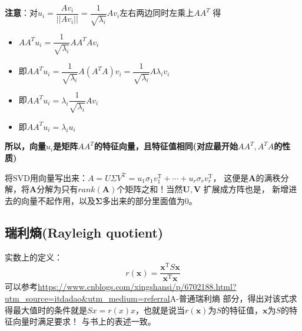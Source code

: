 \textbf{注意}：对$u_{i}=\dfrac{A v_{i}}{\left||A v_{i}\right||}=\dfrac{1}{\sqrt{\lambda_{i}}} A v_{i}$左右两边同时左乘上$AA^T$
    得
\begin{itemize}
    \item $AA^Tu_{i}=\dfrac{1}{\sqrt{\lambda_{i}}} AA^TA v_{i}$
    \item 即$AA^Tu_{i}=\dfrac{1}{\sqrt{\lambda_{i}}} A(A^TA) v_{i}=\dfrac{1}{\sqrt{\lambda_{i}}} A \lambda_i v_{i}$
    \item 即$AA^Tu_{i}=\lambda_i \dfrac{1}{\sqrt{\lambda_{i}}} A  v_{i}$
    \item 即$AA^Tu_{i}=\lambda_i u_i$
\end{itemize}
\textbf{所以，向量$u_i$是矩阵$AA^T$的特征向量，且特征值相同(对应最开始$AA^T, A^TA$的性质)}

将SVD用向量写出来：$A=U \Sigma V^{\mathrm{T}}=u_{1} \sigma_{1} v_{1}^{\mathrm{T}}+\cdots+u_{r} \sigma_{r} v_{r}^{\mathrm{T}}$，
这便是$\bm{A}$的满秩分解，将$\bm{A}$分解为只有$rank(\bm{A})$个矩阵之和！当然$\bm{U,V}$ 扩展成方阵也是，
新增进去的向量不起作用，以及$\bm{\Sigma}$多出来的部分里面值为0。

\subsection{瑞利熵(Rayleigh quotient)}
实数上的定义：
$$r(\boldsymbol{x})=\dfrac{\boldsymbol{x}^{\mathrm{T}} S \boldsymbol{x}}{\boldsymbol{x}^{\mathrm{T}} \boldsymbol{x}}$$
可以参考\url{https://www.cnblogs.com/xingshansi/p/6702188.html?utm_source=itdadao&utm_medium=referral}A-普通瑞利熵
部分，得出对该式求得最大值时的条件就是$S x=r(x) x$，也就是说当$r(\bm{x})$为$S$的特征值，$\bm{x}$为$S$的特征向量时满足要求！
与书上的表述一致。

